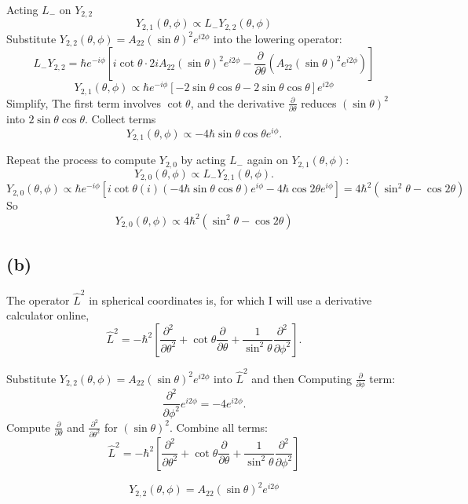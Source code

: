\documentclass[letter, 10pts]{article}
\newcommand{\hb}{\hbar}
\begin{document}
Acting \( L_- \) on \( Y_{2,2} \)
\[
Y_{2,1}(\theta, \phi) \propto L_- Y_{2,2}(\theta, \phi)
\]
Substitute \( Y_{2,2}(\theta, \phi) = A_{22} (\sin\theta)^2 e^{i2\phi} \) into the lowering operator:
   \[
   L_- Y_{2,2} = \hbar e^{-i\phi} \left[i\cot\theta \cdot 2i A_{22} (\sin\theta)^2 e^{i2\phi} - \frac{\partial}{\partial\theta} \left(A_{22} (\sin\theta)^2 e^{i2\phi}\right)\right]
   \]
   \[
	   Y_{2,1}(\theta, \phi) \propto  
	   \hb e^{- i \phi} \left[
 - 2 \sin \theta \cos \theta  - 2 \sin \theta \cos \theta 
	   \right] e^{ i 2 \phi}
   \] 
Simplify, 
The first term involves \( \cot\theta \), and the derivative \( \frac{\partial}{\partial\theta} \) reduces \( (\sin\theta)^2 \) into \( 2\sin\theta\cos\theta \). Collect terms
     \[
     Y_{2,1}(\theta, \phi) \propto - 4 \hb \sin\theta\cos\theta e^{i\phi}.
     \]

Repeat the process to compute \( Y_{2,0} \) by acting \( L_- \) again on \( Y_{2,1}(\theta, \phi) \):
\[
Y_{2,0}(\theta, \phi) \propto L_- Y_{2,1}(\theta, \phi).
\]
\[
	Y_{2,0} (\theta, \phi)\propto 
	\hb e^{- i \phi} 
	\left[
i \cot \theta (i) (- 4\hb \sin \theta \cos \theta )
e^{ i \phi } -  4 \hb \cos 2\theta e^{ i \phi} 
	\right] = 4 \hb^2 (\sin ^2 \theta - \cos 2 \theta)
\] 
So 
\[
	Y_{2,0} (\theta, \phi) \propto 4 \hb^2 (\sin ^2 \theta - \cos 2 \theta )
\] 





\subsection*{(b)} 
The operator \( \hat{L}^2 \) in spherical coordinates is, for which I will use a derivative calculator online, 
\[
\hat{L}^2 = -\hbar^2 \left[\frac{\partial^2}{\partial\theta^2} + \cot\theta \frac{\partial}{\partial\theta} + \frac{1}{\sin^2\theta} \frac{\partial^2}{\partial\phi^2}\right].
\]

Substitute \( Y_{2,2}(\theta, \phi) = A_{22} (\sin\theta)^2 e^{i2\phi} \) into \( \hat{L}^2 \) and then
 Computing \( \frac{\partial}{\partial\phi} \) term:
   \[
   \frac{\partial^2}{\partial\phi^2} e^{i2\phi} = -4 e^{i2\phi}.
   \]
Compute \( \frac{\partial}{\partial\theta} \) and \( \frac{\partial^2}{\partial\theta^2} \) for \( (\sin\theta)^2 \).
 Combine all terms:
 \[
\hat{L}^2 = -\hbar^2 \left[\frac{\partial^2}{\partial\theta^2} + \cot\theta \frac{\partial}{\partial\theta} + \frac{1}{\sin^2\theta} \frac{\partial^2}{\partial\phi^2}\right]
\]

\[
Y_{2,2}(\theta, \phi) = A_{22} (\sin\theta)^2 e^{i2\phi}
\]
\end{document}
